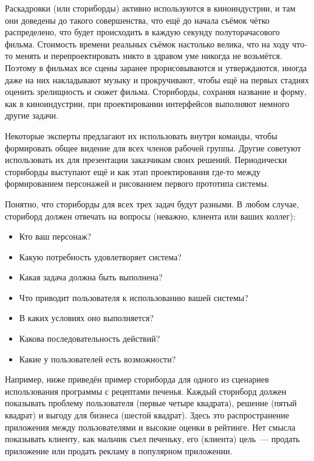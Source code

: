 \documentclass{../../text-style}
\begin{document}
Раскадровки (или сториборды) активно используются в киноиндустрии, и там они доведены до такого совершенства, что ещё до начала съёмок чётко распределено, что будет происходить в каждую секунду полуторачасового фильма. Стоимость времени реальных съёмок настолько велика, что на ходу что-то менять и перепроектировать никто в здравом уме никогда не возьмётся. Поэтому в фильмах все сцены заранее прорисовываются и утверждаются, иногда даже на них накладывают музыку и прокручивают, чтобы ещё на первых стадиях оценить зрелищность и сюжет фильма. Сториборды, сохраняя название и форму, как в киноиндустрии, при проектировании интерфейсов выполняют немного другие задачи.

Некоторые эксперты предлагают их использовать внутри команды, чтобы формировать общее видение для всех членов рабочей группы. Другие советуют использовать их для презентации заказчикам своих решений. Периодически сториборды выступают ещё и как этап проектирования где-то между формированием персонажей и рисованием первого прототипа системы.

Понятно, что сториборды для всех трех задач будут разными. В любом случае, сториборд должен отвечать на вопросы (неважно, клиента или ваших коллег):

\begin{itemize}
    \item Кто ваш персонаж?
    \item Какую потребность удовлетворяет система?
    \item Какая задача должна быть выполнена?
    \item Что приводит пользователя к использованию вашей системы?
    \item В каких условиях оно выполняется?
    \item Какова последовательность действий?
    \item Какие у пользователей есть возможности?
\end{itemize}

Например, ниже приведён пример сториборда для одного из сценариев использования программы с рецептами печенья. Каждый сториборд должен показывать проблему пользователя (первые четыре квадрата), решение (пятый квадрат) и выгоду для бизнеса (шестой квадрат). Здесь это распространение приложения между пользователями и высокие оценки в рейтинге. Нет смысла показывать клиенту, как мальчик съел печеньку, его (клиента) цель~--- продать приложение или продать рекламу в популярном приложении.
\end{document}
